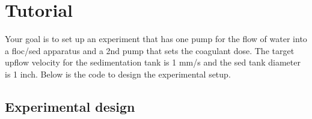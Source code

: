 \documentclass[letterpaper,10pt,english]{sphinxmanual}
\begin{document}
\section{Tutorial}
\label{\detokenize{ProCoDA/ProCoDA:tutorial}}\label{\detokenize{ProCoDA/ProCoDA:heading-procoda-tutorial}}
Your goal is to set up an experiment that has one pump for the flow of water into a floc/sed apparatus and a 2nd pump that sets the coagulant dose. The target upflow velocity for the sedimentation tank is 1 mm/s and the sed tank diameter is 1 inch. Below is the code to design the experimental setup.


\subsection{Experimental design}
\label{\detokenize{ProCoDA/ProCoDA:experimental-design}}
%
\end{document}
